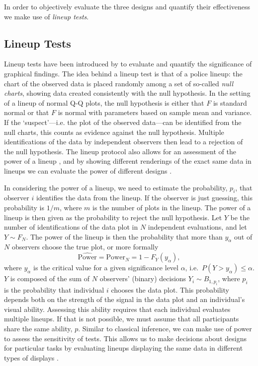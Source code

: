 \documentclass{article}\usepackage[]{graphicx}\usepackage[]{color}
\begin{document}
In order to objectively evaluate  the three designs and quantify their effectiveness we make use of {\it lineup tests}.

\subsection{Lineup Tests}
Lineup tests have been introduced by \citet{buja:2009hp} to evaluate and quantify the significance of graphical findings. The idea behind a lineup test is that of a police lineup: the chart of the observed data is placed randomly among a set of so-called \emph{null charts}, showing data created consistently with the null hypothesis. In the setting of a lineup of normal Q-Q plots, the null hypothesis  is either that $F$ is standard normal or that $F$ is normal with parameters based on sample mean and variance.
If the `suspect'---i.e. the plot of the observed data---can be identified from the null charts, this counts as evidence against the null hypothesis. Multiple identifications of the data by independent observers then lead to a rejection of the null hypothesis. 
The lineup protocol also allows for an assessment of the power of a lineup \citep{mahbub:2013},  
and by showing different renderings of the exact same data in lineups we can evaluate the power  of different designs \citep{Hofmann:2012ts}.

In considering the power of a lineup, we need to estimate the probability, $p_i$, that observer $i$ identifies the data from the lineup. If the observer is just guessing, this probability is $1/m$, where $m$ is the number of plots in the lineup.
The power of a lineup is then given as the probability to reject the null hypothesis. Let $Y$ be the number of identifications of the data plot in $N$ independent evaluations, and let $Y \sim F_N$. The power of the lineup is then the probability that more than $y_\alpha$ out of $N$ observers
choose the true plot, or more formally
\begin{equation}\label{eqn:power}
\widehat{\text{Power}} = \text{Power}_{N} = 1 - F_{Y} (y_{\alpha}),
\end{equation}
where $y_\alpha$ is the critical value for a given significance level $\alpha$, i.e.~$P(Y >  y_{\alpha}) \le \alpha$. $Y$ is composed of the sum of $N$ observers' (binary) decisions $Y_i \sim B_{1, p_i}$, where  $p_i$ is the probability that individual $i$ chooses the data plot. This probability  depends both on the strength of the signal in the data plot and an individual's visual ability.
Assessing this ability requires that each individual evaluates multiple lineups. 
If that is not possible, we must assume that all participants share the same ability, $p$. %
Similar to classical inference, we can make use of power to assess the sensitivity of tests. This allows us to make decisions about designs for particular tasks by evaluating lineups displaying  the same data in different types of displays \citep{Hofmann:2012ts}. 
\end{document}
